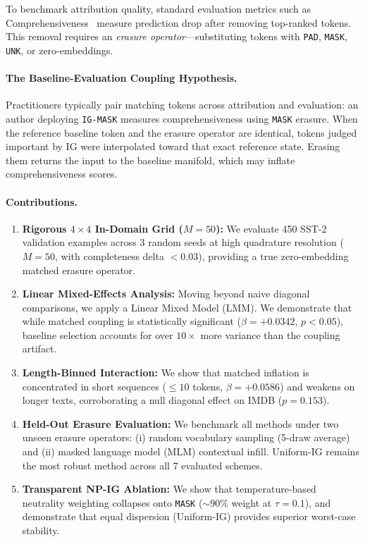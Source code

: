 \documentclass[11pt]{article}
\begin{document}
To benchmark attribution quality, standard evaluation metrics such as Comprehensiveness~\citep{deyoung2020eraser} measure prediction drop after removing top-ranked tokens. This removal requires an \emph{erasure operator}---substituting tokens with \texttt{PAD}, \texttt{MASK}, \texttt{UNK}, or zero-embeddings.

\paragraph{The Baseline-Evaluation Coupling Hypothesis.}
Practitioners typically pair matching tokens across attribution and evaluation: an author deploying \texttt{IG-MASK} measures comprehensiveness using \texttt{MASK} erasure. When the reference baseline token and the erasure operator are identical, tokens judged important by IG were interpolated toward that exact reference state. Erasing them returns the input to the baseline manifold, which may inflate comprehensiveness scores.

\paragraph{Contributions.}
\begin{enumerate}
    \item \textbf{Rigorous $4\times 4$ In-Domain Grid ($M=50$):} We evaluate 450 SST-2 validation examples across 3 random seeds at high quadrature resolution ($M=50$, with completeness delta $< 0.03$), providing a true zero-embedding matched erasure operator.
    \item \textbf{Linear Mixed-Effects Analysis:} Moving beyond naive diagonal comparisons, we apply a Linear Mixed Model (LMM). We demonstrate that while matched coupling is statistically significant ($\beta = +\mathbf{0.0342}$, $p < 0.05$), baseline selection accounts for over $10\times$ more variance than the coupling artifact.
    \item \textbf{Length-Binned Interaction:} We show that matched inflation is concentrated in short sequences ($\le 10$ tokens, $\beta = +\mathbf{0.0586}$) and weakens on longer texts, corroborating a null diagonal effect on IMDB ($p=0.153$).
    \item \textbf{Held-Out Erasure Evaluation:} We benchmark all methods under two unseen erasure operators: (i) random vocabulary sampling (5-draw average) and (ii) masked language model (MLM) contextual infill. Uniform-IG remains the most robust method across all 7 evaluated schemes.
    \item \textbf{Transparent NP-IG Ablation:} We show that temperature-based neutrality weighting collapses onto \texttt{MASK} ($\sim 90\%$ weight at $\tau=0.1$), and demonstrate that equal dispersion (Uniform-IG) provides superior worst-case stability.
\end{enumerate}
\end{document}
